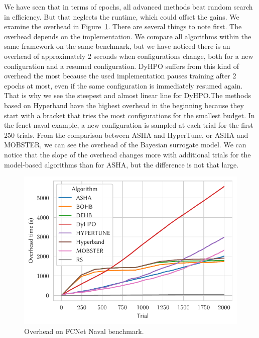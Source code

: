 

We have seen that in terms of epochs, all advanced methods beat random search in efficiency. But that neglects the runtime, which could offset the gains. We examine the overhead in Figure~\ref{fig:overhead}. There are several things to note first. The overhead depends on the implementation. We compare all algorithms within the same framework on the same benchmark, but we have noticed there is an overhead of approximately 2 seconds when configurations change, both for a new configuration and a resumed configuration. DyHPO suffers from this kind of overhead the most because the used implementation pauses training after 2 epochs at most, even if the same configuration is immediately resumed again. That is why we see the steepest and almost linear line for DyHPO.\@ The methods based on Hyperband have the highest overhead in the beginning because they start with a bracket that tries the most configurations for the smallest budget. In the fcnet-naval example, a new configuration is sampled at each trial for the first 250 trials. From the comparison between ASHA and HyperTune, or ASHA and MOBSTER, we can see the overhead of the Bayesian surrogate model. We can notice that the slope of the overhead changes more with additional trials for the model-based algorithms than for ASHA, but the difference is not that large.
\begin{figure}
    \centering
    \includegraphics[scale=0.75]{./img/tabular_exp/overhead.pdf}
    \caption{Overhead on FCNet Naval benchmark.}
    \label{fig:overhead}
\end{figure}

